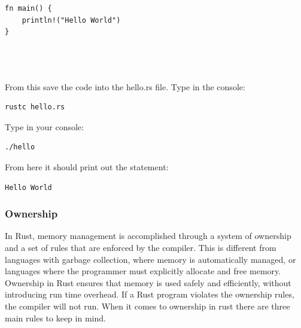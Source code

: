 \documentclass{article}
\theoremstyle{theorem}
\theoremstyle{definition}
\theoremstyle{remark}
\begin{document}
\begin{lstlisting}
fn main() {
    println!("Hello World")
}




\end{lstlisting}
From this save the code into the hello.rs file. Type in the console:
\begin{lstlisting}
rustc hello.rs
\end{lstlisting}
Type in your console:
\begin{lstlisting}
./hello
\end{lstlisting}
From here it should print out the statement:
\begin{lstlisting}
Hello World
\end{lstlisting}

\subsubsection{Ownership}
 In Rust, memory management is accomplished through a system of ownership and a set of rules that are enforced by the compiler. This is different from languages with garbage collection, where memory is automatically managed, or languages where the programmer must explicitly allocate and free memory. Ownership in Rust ensures that memory is used safely and efficiently, without introducing run time overhead. If a Rust program violates the ownership rules, the compiler will not run. When it comes to ownership in rust there are three main rules to keep in mind.\cite{WIO}
\end{document}
